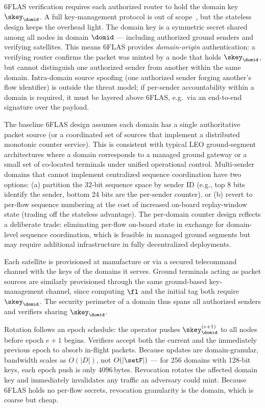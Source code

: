 6FLAS verification requires each authorized router to hold the domain key
$\skey_\domid$. A full key-management protocol is out of scope~\cite{tan2025crossdomain},
but the stateless design keeps the overhead light. The domain key is a symmetric
secret shared among all nodes in domain $\domid$ --- including authorized ground
senders and verifying satellites. This means 6FLAS provides \emph{domain-origin}
authentication: a verifying router confirms the packet was minted by a node that
holds $\skey_\domid$, but cannot distinguish one authorized sender from another
within the same domain. Intra-domain source spoofing (one authorized sender
forging another's flow identifier) is outside the threat model; if per-sender
accountability within a domain is required, it must be layered above 6FLAS,
e.g.\ via an end-to-end signature over the payload.

The baseline 6FLAS design assumes each domain has a single authoritative packet source (or a coordinated set of sources that implement a distributed monotonic counter service). This is consistent with typical LEO ground-segment architectures where a domain corresponds to a managed ground gateway or a small set of co-located terminals under unified operational control. Multi-sender domains that cannot implement centralized sequence coordination have two options: (a) partition the 32-bit sequence space by sender ID (e.g., top 8 bits identify the sender, bottom 24 bits are the per-sender counter), or (b) revert to per-flow sequence numbering at the cost of increased on-board replay-window state (trading off the stateless advantage). The per-domain counter design reflects a deliberate trade: eliminating per-flow on-board state in exchange for domain-level sequence coordination, which is feasible in managed ground segments but may require additional infrastructure in fully decentralized deployments.

Each satellite is provisioned at manufacture or via
a secured telecommand channel with the keys of the domains it serves.
Ground terminals acting as packet sources are similarly provisioned through
the same ground-based key-management channel, since computing $\fl$ and the initial tag both require $\skey_\domid$.
The security perimeter of a domain thus spans all authorized senders and
verifiers sharing $\skey_\domid$.

Rotation follows an epoch schedule: the operator pushes $\skey_{\domid}^{(e+1)}$ to all
nodes before epoch $e{+}1$ begins. Verifiers accept both the current and the
immediately previous epoch to absorb in-flight packets. Because updates are
domain-granular, bandwidth scales as $O(|D|)$, not $O(|\setF|)$ --- for 256
domains with 128-bit keys, each epoch push is only $4096$\,bytes. Revocation
rotates the affected domain key and immediately invalidates any traffic an
adversary could mint. Because 6FLAS holds no per-flow secrets, revocation
granularity is the domain, which is coarse but cheap.

